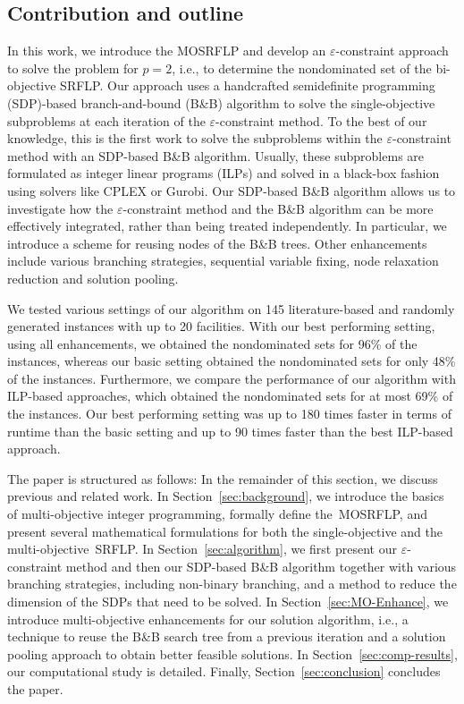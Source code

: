 \documentclass{article}
\newcommand{\BB}{B\&B\xspace}
\newcommand{\SRFLP}{SRFLP\xspace}
\newcommand{\MOSRFLP}{MOSRFLP\xspace}
\begin{document}
\subsection{Contribution and outline}\label{sec:contribution}
In this work, we introduce the \MOSRFLP and develop an $\varepsilon$-constraint approach to solve the problem for $p=2$, i.e., to determine the nondominated set of the bi-objective \SRFLP. Our approach uses a handcrafted semidefinite programming (SDP)-based branch-and-bound (\BB) algorithm to solve the single-objective subproblems at each iteration of the $\varepsilon$-constraint method. To the best of our knowledge, this is the first work to solve the subproblems within the $\varepsilon$-constraint method with an SDP-based \BB algorithm. Usually, these subproblems are formulated as integer linear programs (ILPs) and solved in a black-box fashion using solvers like CPLEX or Gurobi. Our SDP-based \BB algorithm allows us to investigate how the $\varepsilon$-constraint method and the \BB algorithm can be more effectively integrated, rather than being treated independently. In particular, we introduce a scheme for reusing nodes of the \BB trees. Other enhancements include various branching strategies, sequential variable fixing, node relaxation reduction and solution pooling.

We tested various settings of our algorithm on 145 literature-based and randomly generated instances with up to 20 facilities. With our best performing setting, using all enhancements, we obtained the nondominated sets for 96\% of the instances, whereas our basic setting obtained the nondominated sets for only 48\% of the instances. Furthermore, we compare the performance of our algorithm with ILP-based approaches, which obtained the nondominated sets for at most 69\% of the instances. Our best performing setting was up to 180 times faster in terms of runtime than the basic setting and up to 90 times faster than the best ILP-based approach.

The paper is structured as follows: In the remainder of this section, we discuss previous and related work. In Section~\ref{sec:background}, we introduce the basics of multi-objective integer programming, formally define the~\MOSRFLP, and present several mathematical formulations for both the single-objective and the multi-objective~\SRFLP.
In Section~\ref{sec:algorithm}, we first present our $\varepsilon$-constraint method and then our SDP-based \BB algorithm together with various branching strategies, including non-binary branching, and a method to reduce the dimension of the SDPs that need to be solved. In Section~\ref{sec:MO-Enhance}, we introduce multi-objective enhancements for our solution algorithm, i.e., a technique to reuse the \BB search tree from a previous iteration and a solution pooling approach to obtain better feasible solutions. In Section~\ref{sec:comp-results}, our computational study is detailed. Finally, Section~\ref{sec:conclusion} concludes the paper.
\end{document}
